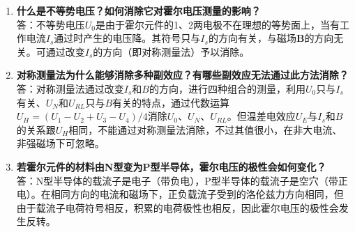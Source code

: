 \begin{enumerate}[label=\arabic* 、, leftmargin=4em, labelsep=0pt]
    \item \textbf{什么是不等势电压？如何消除它对霍尔电压测量的影响？} \\
    答：不等势电压$U_0$是由于霍尔元件的1、2两电极不在理想的等势面上，当有工作电流$I_s$通过时产生的电压降。其符号只与$I_s$的方向有关，与磁场$\mathbf{B}$的方向无关。可通过改变$I_s$的方向（即对称测量法）予以消除。

    \item \textbf{对称测量法为什么能够消除多种副效应？有哪些副效应无法通过此方法消除？} \\
    答：对称测量法通过改变$I_s$和$B$的方向，进行四种组合的测量，利用$U_0$只与$I_s$有关、$U_N$和$U_{RL}$只与$B$有关的特点，通过代数运算$U_H=(U_1-U_2+U_3-U_4)/4$消除$U_0$、$U_N$、$U_{RL}$。但温差电效应$U_E$与$I_s$和$B$的关系跟$U_H$相同，不能通过对称测量法消除，不过其值很小，在非大电流、非强磁场下可忽略。

    \item \textbf{若霍尔元件的材料由N型变为P型半导体，霍尔电压的极性会如何变化？} \\
    答：N型半导体的载流子是电子（带负电），P型半导体的载流子是空穴（带正电）。在相同方向的电流和磁场下，正负载流子受到的洛伦兹力方向相同，但由于载流子电荷符号相反，积累的电荷极性也相反，因此霍尔电压的极性会发生反转。
\end{enumerate}
